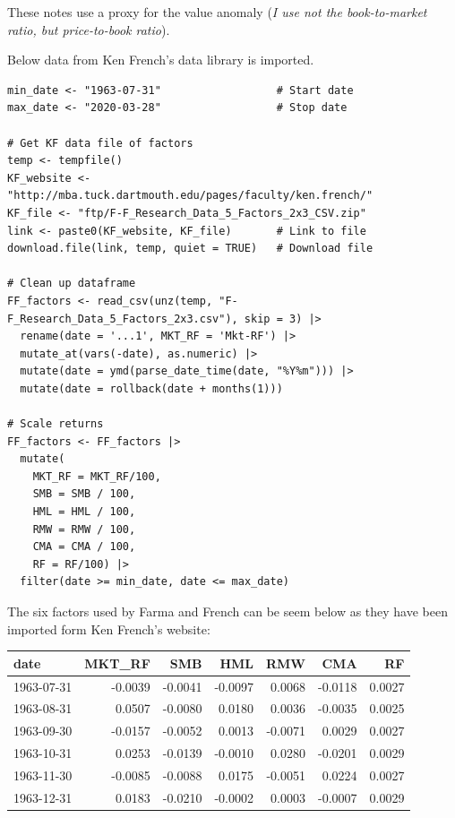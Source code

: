 These notes use a proxy for the value anomaly (\textit{I use not the book-to-market ratio, but price-to-book ratio}).

Below data from Ken French's data library is imported.
\begin{lstlisting}
min_date <- "1963-07-31"                  # Start date
max_date <- "2020-03-28"                  # Stop date

# Get KF data file of factors
temp <- tempfile()
KF_website <- "http://mba.tuck.dartmouth.edu/pages/faculty/ken.french/"
KF_file <- "ftp/F-F_Research_Data_5_Factors_2x3_CSV.zip"
link <- paste0(KF_website, KF_file)       # Link to file
download.file(link, temp, quiet = TRUE)   # Download file

# Clean up dataframe 
FF_factors <- read_csv(unz(temp, "F-F_Research_Data_5_Factors_2x3.csv"), skip = 3) |> 
  rename(date = '...1', MKT_RF = 'Mkt-RF') |> 
  mutate_at(vars(-date), as.numeric) |> 
  mutate(date = ymd(parse_date_time(date, "%Y%m"))) |> 
  mutate(date = rollback(date + months(1)))

# Scale returns
FF_factors <- FF_factors |> 
  mutate(
    MKT_RF = MKT_RF/100,
    SMB = SMB / 100,
    HML = HML / 100,
    RMW = RMW / 100,
    CMA = CMA / 100,
    RF = RF/100) |> 
  filter(date >= min_date, date <= max_date)
\end{lstlisting}

The six factors used by Farma and French can be seem below as they have been imported form Ken French's website:
\begin{table}[H]
    \centering
    \begin{tabular}[t]{lrrrrrr}
    \toprule
    date & MKT\_RF & SMB & HML & RMW & CMA & RF\\
    \midrule
    1963-07-31 & -0.0039 & -0.0041 & -0.0097 & 0.0068 & -0.0118 & 0.0027\\
    1963-08-31 & 0.0507 & -0.0080 & 0.0180 & 0.0036 & -0.0035 & 0.0025\\
    1963-09-30 & -0.0157 & -0.0052 & 0.0013 & -0.0071 & 0.0029 & 0.0027\\
    1963-10-31 & 0.0253 & -0.0139 & -0.0010 & 0.0280 & -0.0201 & 0.0029\\
    1963-11-30 & -0.0085 & -0.0088 & 0.0175 & -0.0051 & 0.0224 & 0.0027\\
    1963-12-31 & 0.0183 & -0.0210 & -0.0002 & 0.0003 & -0.0007 & 0.0029\\
    \bottomrule
    \end{tabular}
\end{table}

